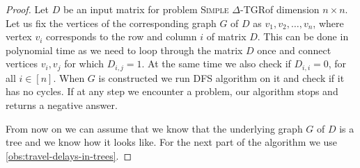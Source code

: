 \documentclass[11pt,a4paper]{article}
\theoremstyle{remark}
\theoremstyle{definition}
\newcommand{\deltaExact}{\textsc{Simple $\Delta$-TGR}}
\begin{document}
\begin{proof}
    Let $D$ be an input matrix for problem \deltaExact of dimension $n \times n$.
    Let us fix the vertices of the corresponding graph $G$ of $D$ as $v_1, v_2, \dots, v_n$, where vertex $v_i$ corresponds to the row and column $i$ of matrix $D$.
    This can be done in polynomial time as we need to loop through the matrix $D$ once and connect vertices $v_i, v_j$ for which $D_{i,j} = 1$. At the same time we also check if $D_{i,i} = 0$, for all $i \in [n]$.
    When $G$ is constructed we run DFS algorithm on it and check if it has no cycles.
    If at any step we encounter a problem, our algorithm stops and returns a negative answer.
    
    From now on we can assume that we know that the underlying graph $G$ of $D$ is a tree and we know how it looks like.
    For the next part of the algorithm we use \cref{obs:travel-delays-in-trees}.
    

\end{proof}
\end{document}
